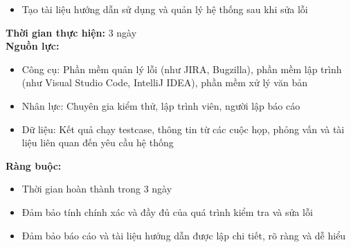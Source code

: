 {\begin{minipage}{\textwidth}
\begin{itemize}
        \item Tạo tài liệu hướng dẫn sử dụng và quản lý hệ thống sau khi sửa lỗi
    \end{itemize}
    \noindent \textbf{Thời gian thực hiện:} 3 ngày \\
    \noindent \textbf{Nguồn lực:}
    \begin{itemize}
        \item Công cụ: Phần mềm quản lý lỗi (như JIRA, Bugzilla), phần mềm lập trình (như Visual Studio Code, IntelliJ IDEA), phần mềm xử lý văn bản
        \item Nhân lực: Chuyên gia kiểm thử, lập trình viên, người lập báo cáo
        \item Dữ liệu: Kết quả chạy testcase, thông tin từ các cuộc họp, phỏng vấn và tài liệu liên quan đến yêu cầu hệ thống
    \end{itemize}
    \noindent \textbf{Ràng buộc:}
    \begin{itemize}
        \item Thời gian hoàn thành trong 3 ngày
        \item Đảm bảo tính chính xác và đầy đủ của quá trình kiểm tra và sửa lỗi
        \item Đảm bảo báo cáo và tài liệu hướng dẫn được lập chi tiết, rõ ràng và dễ hiểu
    \end{itemize}
    \end{minipage}
}
\newpage
{}    
